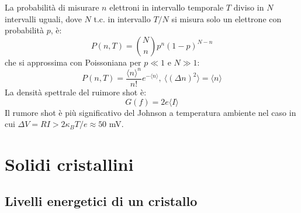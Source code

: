 \documentclass[10pt, a4paper]{scrartcl}
\numberwithin{equation}{subsection}
\theoremstyle{style1}
\begin{document}
La probabilit\`a di misurare $n$ elettroni in intervallo temporale $T$ diviso in $N$ intervalli uguali, dove $N$ t.c. in intervallo $T / N$ si misura solo un elettrone con probabilit\`a $p$, \`e:
\begin{equation}
	P(n,T) = \binom{N}{n} p^n (1-p)^{N-n} 
\end{equation}
che si approssima con Poissoniana per $p\ll 1 $ e $N \gg 1$:
\begin{equation}
	P(n,T) = \frac{\langle n \rangle^n}{n!}e^{- \langle n \rangle} ,\ \langle (\Delta n)^2 \rangle = \langle n \rangle
\end{equation}
La densit\`a spettrale del ruimore shot \`e:
\begin{equation}
	G(f) = 2e \langle I \rangle
\end{equation}
Il rumore shot \`e pi\`u significativo del Johnson a temperatura ambiente nel caso in cui $\Delta V = RI > 2\kappa _BT / e \approx 50$ mV.







































\newpage
\section{Solidi cristallini}
\subsection{Livelli energetici di un cristallo}
\end{document}
